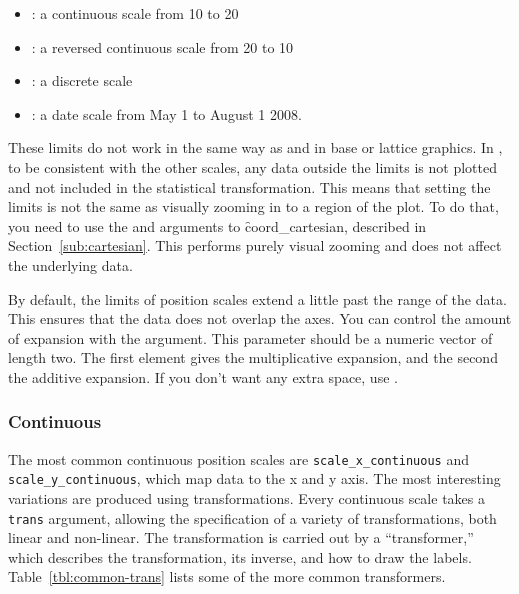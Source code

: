 \begin{itemize}
  \item {}: a continuous scale from 10 to 20
  \item {}: a reversed continuous scale from 20 to 10
  \item {}: a discrete scale
  \item {}: a date scale from May 1 to August 1 2008.
\end{itemize}

These limits do not work in the same way as  and  in base or lattice graphics.  In \ggplot, to be consistent with the other scales, any data outside the limits is not plotted and not included in the statistical transformation.  This means that setting the limits is not the same as visually zooming in to a region of the plot.  To do that, you need to use the  and  arguments to \f{coord_cartesian}, described in Section~\ref{sub:cartesian}.  This performs purely visual zooming and does not affect the underlying data.


By default, the limits of position scales extend a little past the range of the data. This ensures that the data does not overlap the axes. You can control the amount of expansion with the  argument. This parameter should be a numeric vector of length two. The first element gives the multiplicative expansion, and the second the additive expansion.  If you don't want any extra space, use .

\subsubsection{Continuous}
\label{sub:scale-continuous}

The most common continuous position scales are {\tt scale\_x\_continuous} and {\tt scale\_y\_continuous}, which map data to the x and y axis.  The most interesting variations are produced using transformations.  Every continuous scale takes a {\tt trans} argument, allowing the specification of a variety of transformations, both linear and non-linear.  The transformation is carried out by a ``transformer,'' which describes the transformation, its inverse, and how to draw the labels. Table~\ref{tbl:common-trans} lists some of the more common transformers.

